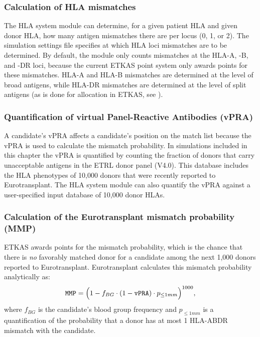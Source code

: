 \documentclass[11pt,twoside,]{book}
\begin{document}
\subsubsection{Calculation of HLA mismatches}\label{sec:etkidneyhlammcalc}

The HLA system module can determine, for a given patient HLA and given
donor HLA, how many antigen mismatches there are per locus (0, 1, or 2).
The simulation settings file specifies at which HLA loci mismatches are to
be determined. By default, the module only counts mismatches
at the HLA-A, -B, and -DR loci, because the current ETKAS point
system only awards points for these mismatches. HLA-A and HLA-B
mismatches are determined at the level of broad antigens, while HLA-DR
mismatches are determined at the level of split antigens (as is done
for allocation in ETKAS, see \citep{manualKidney}).

\subsubsection{Quantification of virtual Panel-Reactive Antibodies (vPRA)}\label{sec:etkidneyvpracalc}

A candidate's vPRA affects a candidate's position on the match list
because the vPRA is used to calculate the mismatch probability.
In simulations included in this chapter the vPRA is quantified by
counting the fraction of donors that carry unacceptable antigens in
the ETRL donor panel (V4.0). This database includes the HLA phenotypes
of 10,000 donors that were recently reported to Eurotransplant.
The HLA system module can also quantify the
vPRA against a user-specified input database of 10,000 donor HLAs.

\subsubsection{Calculation of the Eurotransplant mismatch probability (MMP)}\label{sec:etkidneymmp}

ETKAS awards points for the mismatch probability, which is the chance
that there is \emph{no} favorably matched donor for a candidate among the next
1,000 donors reported to Eurotransplant. Eurotransplant calculates
this mismatch probability analytically as:
\[\texttt{MMP} = \Bigl(1 - f_{BG}\cdot (1-\texttt{vPRA})\cdot p_{\leq1mm}\Bigr)^{1000},\]
where \(f_{BG}\) is the candidate's blood group frequency and
\(p_{\leq1mm}\) is a quantification of the probability that a donor has at
most 1 HLA-ABDR mismatch with the candidate.
\end{document}
